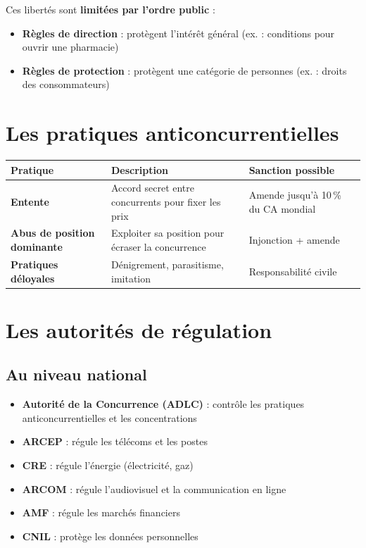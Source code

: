\documentclass[11pt,a4paper]{article}
\begin{document}
Ces libertés sont \textbf{limitées par l'ordre public} :
\begin{itemize}
  \item \textbf{Règles de direction} : protègent l'intérêt général (ex. : conditions pour ouvrir une pharmacie)
  \item \textbf{Règles de protection} : protègent une catégorie de personnes (ex. : droits des consommateurs)
\end{itemize}

\section*{Les pratiques anticoncurrentielles}

\begin{center}
\begin{tabular}{|l|l|l|}
\hline
\textbf{Pratique} & \textbf{Description} & \textbf{Sanction possible} \\
\hline
\textbf{Entente} & Accord secret entre concurrents pour fixer les prix & Amende jusqu'à 10\,\% du CA mondial \\
\textbf{Abus de position dominante} & Exploiter sa position pour écraser la concurrence & Injonction + amende \\
\textbf{Pratiques déloyales} & Dénigrement, parasitisme, imitation & Responsabilité civile \\
\hline
\end{tabular}
\end{center}

\section*{Les autorités de régulation}

\subsection*{Au niveau national}
\begin{itemize}
  \item \textbf{Autorité de la Concurrence (ADLC)} : contrôle les pratiques anticoncurrentielles et les concentrations
  \item \textbf{ARCEP} : régule les télécoms et les postes
  \item \textbf{CRE} : régule l'énergie (électricité, gaz)
  \item \textbf{ARCOM} : régule l'audiovisuel et la communication en ligne
  \item \textbf{AMF} : régule les marchés financiers
  \item \textbf{CNIL} : protège les données personnelles
\end{itemize}
\end{document}
